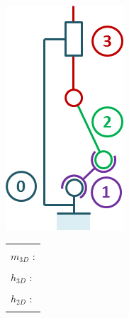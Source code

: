 \documentclass[10pt,fleqn]{article} %
\begin{document}
\begin{multicols}{2}
\begin{minipage}[c]{.45\linewidth}
\begin{center}
\includegraphics[width=.8\linewidth]{images/cas_07.png}
\end{center}
\end{minipage} \hfill
\begin{minipage}[c]{.5\linewidth}
\begin{center}
\begin{tabular}{|p{3cm}|}
\hline 
\\
$m_{3D}$ : \\
\\
$h_{3D}$ : \\
\\
$h_{2D}$ : \\
\\
\hline
\end{tabular}
\end{center}
\end{minipage}



\end{multicols}
\end{document}
